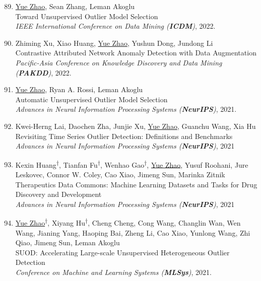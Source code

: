 \documentclass[margin,line,pifont,palatino,courier]{res}
\newcommand{\equalcontrib}{\textsuperscript{$\dagger$}}
\newenvironment{benumerate}[1]{
    \let\oldItem\item
    \def\item{\addtocounter{enumi}{-2}\oldItem}
    \begin{enumerate}[leftmargin=0.25in,label=\textcolor{uscred}{\arabic*.}]
    \setcounter{enumi}{#1}
    \addtocounter{enumi}{1}
}{
    \end{enumerate}
}
\begin{document}
\begin{resume}
\begin{benumerate}{88}
    \item \underline{Yue Zhao}, Sean Zhang, Leman Akoglu\\
    Toward Unsupervised Outlier Model Selection\\
    \textit{IEEE International Conference on Data Mining (\textbf{ICDM})}, 2022. 

    \item Zhiming Xu, Xiao Huang, \underline{Yue Zhao}, Yushun Dong, Jundong Li\\
    Contrastive Attributed Network Anomaly Detection with Data Augmentation\\ 
    \textit{Pacific-Asia Conference on Knowledge Discovery and Data Mining (\textbf{PAKDD})}, 2022.

    \item \underline{Yue Zhao}, Ryan A. Rossi, Leman Akoglu\\
    Automatic Unsupervised Outlier Model Selection\\ 
    {\textit{Advances in Neural Information Processing Systems (\textbf{NeurIPS})}, 2021}.

    \item Kwei-Herng Lai, Daochen Zha, Junjie Xu, \underline{Yue Zhao}, Guanchu Wang, Xia Hu\\
    Revisiting Time Series Outlier Detection: Definitions and Benchmarks\\ 
    {\textit{Advances in Neural Information Processing Systems (\textbf{NeurIPS})}, 2021}
    
    \item Kexin Huang\equalcontrib, Tianfan Fu\equalcontrib, Wenhao Gao\equalcontrib, \underline{Yue Zhao}, Yusuf Roohani, Jure Leskovec, Connor W. Coley, Cao Xiao, Jimeng Sun, Marinka Zitnik\\
    Therapeutics Data Commons: Machine Learning Datasets and Tasks for Drug Discovery and Development\\ 
    {\textit{Advances in Neural Information Processing Systems (\textbf{NeurIPS})}, 2021}


    \item \underline{Yue Zhao\equalcontrib}, Xiyang Hu\equalcontrib, Cheng Cheng, Cong Wang, Changlin Wan, Wen Wang, Jianing Yang, Haoping Bai, Zheng Li, Cao Xiao, Yunlong Wang, Zhi Qiao, Jimeng Sun, Leman Akoglu\\
    SUOD: Accelerating Large-scale Unsupervised Heterogeneous Outlier Detection\\
    \textit{Conference on Machine and Learning Systems (\textbf{MLSys})}, 2021.
    

\end{benumerate}
\end{resume}
\end{document}
